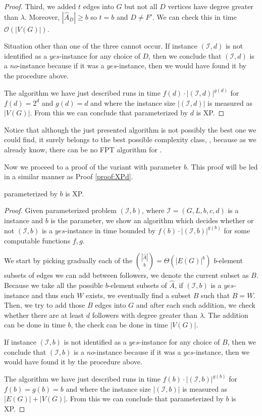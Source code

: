\begin{proof}
    Third, we added $t$ edges into $G$ but not all $D$ vertices have degree greater than $\lambda$.
    Moreover, $|\hat{A}_D| \geq b$ so $t = b$ and $D \neq F'$.
    We can check this in time $\mathcal{O}(|V(G)|)$.

    Situation other than one of the three cannot occur.
    If instance $(\mathcal{I}, d)$ is not identified as a $yes$-instance for any choice of $D$,
    then we conclude that $(\mathcal{I}, d)$ is a $no$-instance because if it was a $yes$-instance,
    then we would have found it by the procedure above.
    
    The algorithm we have just described runs in time $f(d) \cdot |(\mathcal{I}, d)|^{g(d)}$ for $f(d) = 2^d$ and $g(d) = d$
    and where the instance size $|(\mathcal{I}, d)|$ is measured as $|V(G)|$.
    From this we can conclude that \HL parameterized by $d$ is XP.
\end{proof}

Notice that although the just presented algorithm is not possibly the best one we could find,
it surely belongs to the best possible complexity class, \XP, because as we already know,
there can be no FPT algorithm for \HL. 


Now we proceed to a proof of the variant with parameter $b$.
This proof will be led in a similar manner as Proof \ref{proof:XPd}.

\begin{theorem}
    \HL parameterized by $b$ is XP.
\end{theorem}

\begin{proof}
    Given parameterized problem $(\mathcal{I}, b)$, where $\mathcal{I} = (G, L, b, c, d)$ is a \HLdeg instance and $b$ is the parameter,
    we show an algorithm which decides whether or not $(\mathcal{I}, b)$ is a $yes$-instance in time bounded by
    $f(b) \cdot |(\mathcal{I}, b)|^{g(b)}$ for some computable functions $f,g$.

    We start by picking gradually each of the $\binom{|\hat{A}|}{b} = \Theta(|E(G)|^b)$ $b$-element subsets of
    edges we can add between followers, we denote the current subset as $B$.
    Because we take all the possible $b$-element subsets of $\hat{A}$, if $(\mathcal{I}, b)$ is a $yes$-instance and
    thus such $W$ exists, we eventually find a subset $B$ such that $B = W$.
    Then, we try to add those $B$ edges into $G$ and after each such addition, we check whether there are at least $d$ followers
    with degree greater than $\lambda$. The addition can be done in time $b$, the check can be done in time $|V(G)|$.

    If instance $(\mathcal{I}, b)$ is not identified as a $yes$-instance for any choice of $B$,
    then we conclude that $(\mathcal{I}, b)$ is a $no$-instance because if it was a $yes$-instance,
    then we would have found it by the procedure above.

    The algorithm we have just described runs in time $f(b) \cdot |(\mathcal{I}, b)|^{g(b)}$ for $f(b) = g(b) = b$
    and where the instance size $|(\mathcal{I}, b)|$ is measured as $|E(G)| + |V(G)|$.
    From this we can conclude that \HL parameterized by $b$ is XP.
\end{proof}


